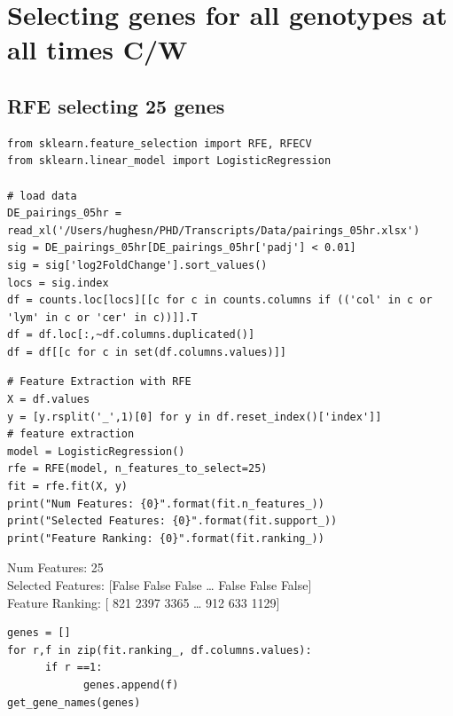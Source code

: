\documentclass[11pt]{article}
\begin{document}
\section{Selecting genes for all genotypes at all times C/W}
\label{sec:orgdc8d628}
\subsection{RFE selecting 25 genes}
\label{sec:org6b5cc95}
\begin{verbatim}
from sklearn.feature_selection import RFE, RFECV
from sklearn.linear_model import LogisticRegression

# load data
DE_pairings_05hr = read_xl('/Users/hughesn/PHD/Transcripts/Data/pairings_05hr.xlsx')
sig = DE_pairings_05hr[DE_pairings_05hr['padj'] < 0.01]
sig = sig['log2FoldChange'].sort_values()
locs = sig.index
df = counts.loc[locs][[c for c in counts.columns if (('col' in c or 'lym' in c or 'cer' in c))]].T
df = df.loc[:,~df.columns.duplicated()]
df = df[[c for c in set(df.columns.values)]]
\end{verbatim}

\begin{verbatim}
# Feature Extraction with RFE
X = df.values
y = [y.rsplit('_',1)[0] for y in df.reset_index()['index']]
# feature extraction
model = LogisticRegression()
rfe = RFE(model, n_features_to_select=25)
fit = rfe.fit(X, y)
print("Num Features: {0}".format(fit.n_features_))
print("Selected Features: {0}".format(fit.support_))
print("Feature Ranking: {0}".format(fit.ranking_))
\end{verbatim}

Num Features: 25\\
Selected Features: [False False False \ldots{} False False False]\\
Feature Ranking: [ 821 2397 3365 \ldots{}  912  633 1129]\\


\begin{verbatim}
genes = []
for r,f in zip(fit.ranking_, df.columns.values):
      if r ==1:
            genes.append(f)
get_gene_names(genes)
\end{verbatim}
\end{document}
